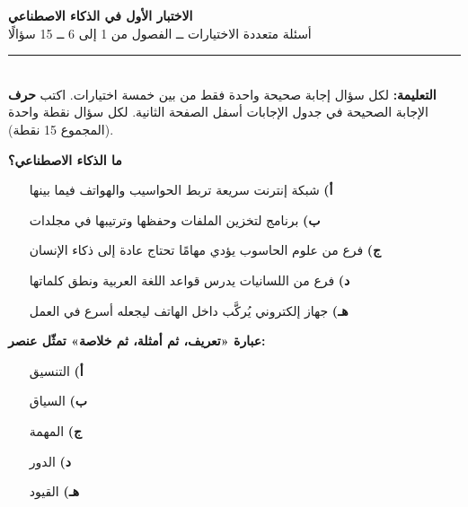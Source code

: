 \documentclass[11pt,a4paper]{article}
\begin{document}
\begin{center}
{\Large\khatt\textbf{الاختبار الأول في الذكاء الاصطناعي}}\\[2pt]
{\normalsize أسئلة متعددة الاختيارات ــ الفصول من 1 إلى 6 ــ 15 سؤالًا}
\end{center}
\vspace{-4pt}\rule{\textwidth}{0.6pt}\\
{\small\textbf{التعليمة:} لكل سؤال إجابة صحيحة واحدة فقط من بين خمسة اختيارات.
اكتب \textbf{حرف} الإجابة الصحيحة في جدول الإجابات أسفل الصفحة الثانية.
لكل سؤال نقطة واحدة (المجموع 15 نقطة).}
\vspace{-2pt}
\begin{multicols}{2}

\noindent\begin{minipage}{\linewidth}
\hangindent=0.7cm\textbf{ما الذكاء الاصطناعي؟}
\begin{itemize}[leftmargin=0.95cm, labelsep=4pt, itemsep=0pt, topsep=2pt, parsep=0pt]
  \item[\textbf{أ)}] شبكة إنترنت سريعة تربط الحواسيب والهواتف فيما بينها
  \item[\textbf{ب)}] برنامج لتخزين الملفات وحفظها وترتيبها في مجلدات
  \item[\textbf{ج)}] فرع من علوم الحاسوب يؤدي مهامًا تحتاج عادة إلى ذكاء الإنسان
  \item[\textbf{د)}] فرع من اللسانيات يدرس قواعد اللغة العربية ونطق كلماتها
  \item[\textbf{هـ)}] جهاز إلكتروني يُركَّب داخل الهاتف ليجعله أسرع في العمل
\end{itemize}
\end{minipage}\par\vspace{7pt plus 4pt}
\noindent\begin{minipage}{\linewidth}
\hangindent=0.7cm\textbf{عبارة «تعريف، ثم أمثلة، ثم خلاصة» تمثّل عنصر:}
\begin{itemize}[leftmargin=0.95cm, labelsep=4pt, itemsep=0pt, topsep=2pt, parsep=0pt]
  \item[\textbf{أ)}] التنسيق
  \item[\textbf{ب)}] السياق
  \item[\textbf{ج)}] المهمة
  \item[\textbf{د)}] الدور
  \item[\textbf{هـ)}] القيود
\end{itemize}
\end{minipage}\par\vspace{7pt plus 4pt}

\end{multicols}
\end{document}
